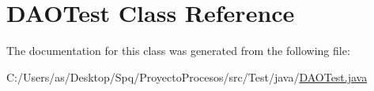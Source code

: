 \hypertarget{class_d_a_o_test}{}\section{D\+A\+O\+Test Class Reference}
\label{class_d_a_o_test}


The documentation for this class was generated from the following file\+:\begin{DoxyCompactItemize}
\item 
C\+:/\+Users/as/\+Desktop/\+Spq/\+Proyecto\+Procesos/src/\+Test/java/\mbox{\hyperlink{_d_a_o_test_8java}{D\+A\+O\+Test.\+java}}\end{DoxyCompactItemize}
